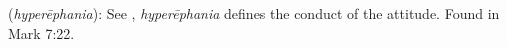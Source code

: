 \item[Haughty disdain,]

(\textit{hyperēphania}):
See , \emph{hyperēphania} defines the conduct of the attitude.
Found in Mark 7:22.
